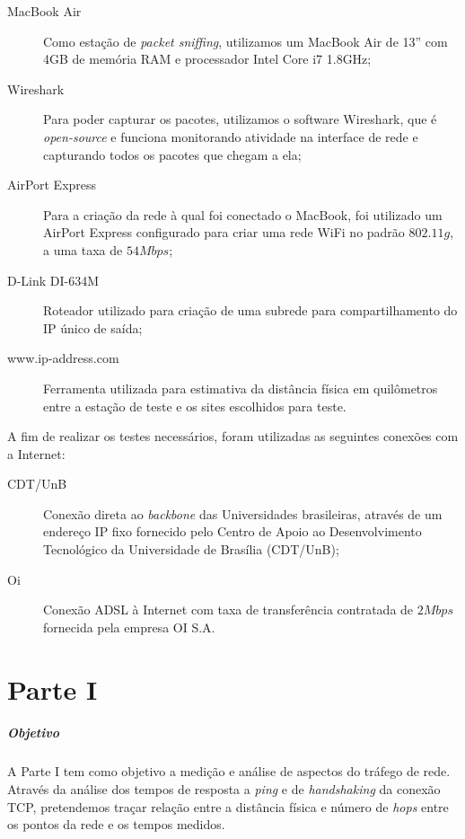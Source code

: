 \documentclass[12pt,a4paper]{report}
\begin{document}
\begin{description}
\item[MacBook Air] Como estação de \textit{packet sniffing}, utilizamos um MacBook Air de 13'' com 4GB de memória RAM e processador Intel Core i7 1.8GHz;
\item[Wireshark] Para poder capturar os pacotes, utilizamos o software Wireshark, que é \textit{open-source} e funciona monitorando atividade na interface de rede e capturando todos os pacotes que chegam a ela;
\item[AirPort Express] Para a criação da rede à qual foi conectado o MacBook, foi utilizado um AirPort Express configurado para criar uma rede WiFi no padrão \(802.11g\), a uma taxa de \(54Mbps\);
\item[D-Link DI-634M] Roteador utilizado para criação de uma subrede para compartilhamento do IP único de saída;
\item[www.ip-address.com] Ferramenta utilizada para estimativa da distância física em quilômetros entre a estação de teste e os sites escolhidos para teste.
\end{description}

A fim de realizar os testes necessários, foram utilizadas as seguintes conexões com a Internet:

\begin{description}
\item[CDT/UnB] Conexão direta ao \textit{backbone} das Universidades brasileiras, através de um endereço IP fixo fornecido pelo Centro de Apoio ao Desenvolvimento Tecnológico da Universidade de Brasília (CDT/UnB);
\item[Oi] Conexão ADSL à Internet com taxa de transferência contratada de \(2Mbps\) fornecida pela empresa OI S.A.
\end{description}

\chapter{Parte I}

\paragraph{Objetivo} A Parte I tem como objetivo a medição e análise de aspectos do tráfego de rede. Através da análise dos tempos de resposta a \textit{ping} e de \textit{handshaking} da conexão TCP, pretendemos traçar relação entre a distância física e número de \textit{hops} entre os pontos da rede e os tempos medidos.
\end{document}
